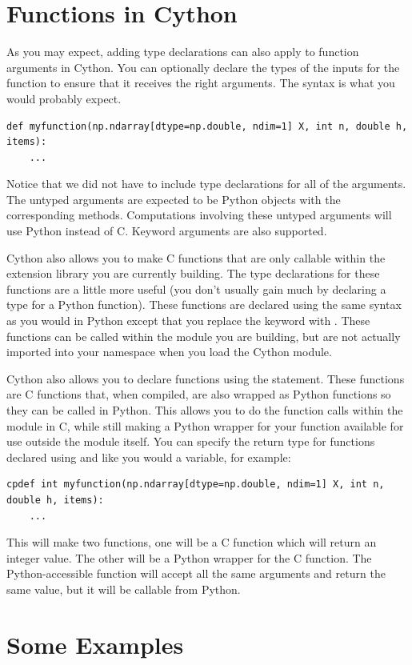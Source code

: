 \section*{Functions in Cython}
As you may expect, adding type declarations can also apply to function arguments in Cython.
You can optionally declare the types of the inputs for the function to ensure that it receives the right arguments.
The syntax is what you would probably expect.
\begin{lstlisting}
def myfunction(np.ndarray[dtype=np.double, ndim=1] X, int n, double h, items):
    ...
\end{lstlisting}
Notice that we did not have to include type declarations for all of the arguments.
The untyped arguments are expected to be Python objects with the corresponding methods.
Computations involving these untyped arguments will use Python instead of C.
Keyword arguments are also supported.

Cython also allows you to make C functions that are only callable within the extension library you are currently building.
The type declarations for these functions are a little more useful (you don't usually gain much by declaring a type for a Python function).
These functions are declared using the same syntax as you would in Python except that you replace the keyword  with .
These functions can be called within the module you are building, but are not actually imported into your namespace when you load the Cython module.

Cython also allows you to declare functions using the  statement.
These functions are C functions that, when compiled, are also wrapped as Python functions so they can be called in Python.
This allows you to do the function calls within the module in C, while still making a Python wrapper for your function available for use outside the module itself.
You can specify the return type for functions declared using  and  like you would a variable, for example:
\begin{lstlisting}
cpdef int myfunction(np.ndarray[dtype=np.double, ndim=1] X, int n, double h, items):
    ...
\end{lstlisting}
This will make two functions, one will be a C function which will return an integer value.
The other will be a Python wrapper for the C function.
The Python-accessible function will accept all the same arguments and return the same value, but it will be callable from Python.

\section*{Some Examples}

